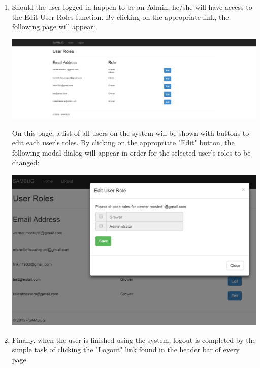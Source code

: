 \documentclass[11pt,a4paper,titlepage]{article}
\begin{document}
\begin{enumerate}
\begin{enumerate}
	\end{enumerate}
\item Should the user logged in happen to be an Admin, he/she will have access to the Edit User Roles function. By clicking on the appropriate link, the following page will appear: 
	\begin{center}
		\includegraphics[scale=0.3]{edituserroles.png}
	\end{center}
	On this page, a list of all users on the system will be shown with buttons to edit each user's roles. By clicking on the appropriate "Edit" button, the following modal dialog will appear in order for the selected user's roles to be changed:
		\begin{center}
			\includegraphics[scale=0.3]{edituserrole.png}
		\end{center}
\item Finally, when the user is finished using the system, logout is completed by the simple task of clicking the "Logout" link found in the header bar of every page.
	\end{enumerate}
\end{document}
